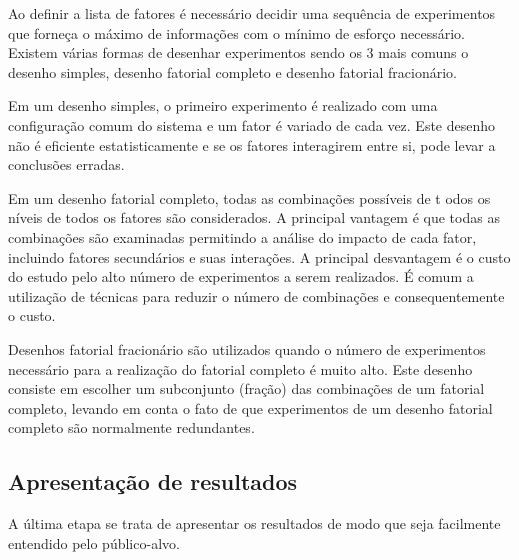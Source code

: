 Ao definir a lista de fatores é necessário decidir uma sequência de experimentos que forneça o máximo de informações com o mínimo de esforço necessário. Existem várias formas de desenhar experimentos sendo os 3 mais comuns o desenho simples, desenho fatorial completo e desenho fatorial fracionário.

Em um desenho simples, o primeiro experimento é realizado com uma configuração comum do sistema e um fator é variado de cada vez. Este desenho não é eficiente estatisticamente e se os fatores interagirem entre si, pode levar a conclusões erradas.

Em um desenho fatorial completo, todas as combinações possíveis de t odos os níveis de todos os fatores são considerados. A principal vantagem é que todas as combinações são examinadas permitindo a análise do impacto de cada fator, incluindo fatores secundários e suas interações. A principal desvantagem é o custo do estudo pelo alto número de experimentos a serem realizados. É comum a utilização de técnicas para reduzir o número de combinações e consequentemente o custo.

Desenhos fatorial fracionário são utilizados quando o número de experimentos necessário para a realização do fatorial completo é muito alto. Este desenho consiste em escolher um subconjunto (fração) das combinações de um fatorial completo, levando em conta o fato de que experimentos de um desenho fatorial completo são normalmente redundantes.

\subsection{Apresentação de resultados}

A última etapa se trata de apresentar os resultados de modo que seja facilmente entendido pelo público-alvo.